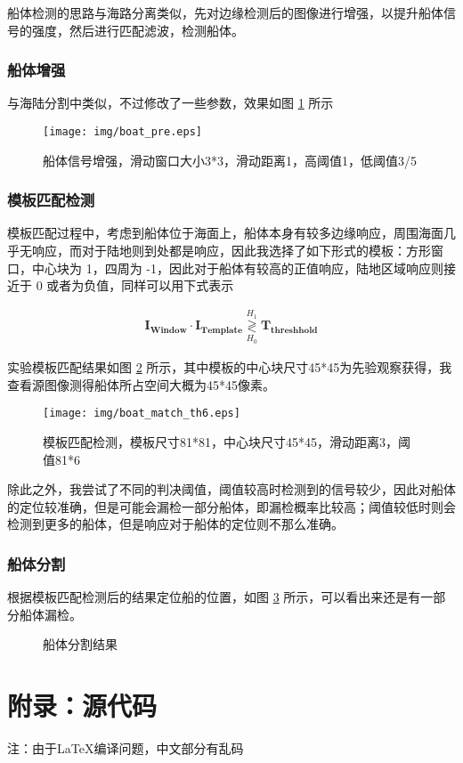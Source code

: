\documentclass[UTF8,12pt]{ctexart}
\begin{document}
船体检测的思路与海路分离类似，先对边缘检测后的图像进行增强，以提升船体信号的强度，然后进行匹配滤波，检测船体。

\subsubsection{船体增强}

与海陆分割中类似，不过修改了一些参数，效果如图 \ref{img_boat_enhance} 所示

\begin{figure}[!htbp]
	\centering
	\texttt{[image: img/boat\_pre.eps]}
	\caption{船体信号增强，滑动窗口大小3*3，滑动距离1，高阈值1，低阈值3/5}
	\label{img_boat_enhance}
\end{figure}

\subsubsection{模板匹配检测}

模板匹配过程中，考虑到船体位于海面上，船体本身有较多边缘响应，周围海面几乎无响应，而对于陆地则到处都是响应，因此我选择了如下形式的模板：方形窗口，中心块为 1，四周为 -1，因此对于船体有较高的正值响应，陆地区域响应则接近于 0 或者为负值，同样可以用下式表示

\begin{align*}
\boldsymbol{I_{Window} \cdot I_{Template}} \mathop{\gtrless}\limits_{H_0}^{H_1} \boldsymbol{T_{threshhold}}
\end{align*}

实验模板匹配结果如图 \ref{img_boat_match} 所示，其中模板的中心块尺寸45*45为先验观察获得，我查看源图像测得船体所占空间大概为45*45像素。

\begin{figure}[!htbp]
	\centering
	\texttt{[image: img/boat\_match\_th6.eps]}
	\caption{模板匹配检测，模板尺寸81*81，中心块尺寸45*45，滑动距离3，阈值81*6}
	\label{img_boat_match}
\end{figure}

除此之外，我尝试了不同的判决阈值，阈值较高时检测到的信号较少，因此对船体的定位较准确，但是可能会漏检一部分船体，即漏检概率比较高；阈值较低时则会检测到更多的船体，但是响应对于船体的定位则不那么准确。

\subsubsection{船体分割}

根据模板匹配检测后的结果定位船的位置，如图 \ref{img_boat} 所示，可以看出来还是有一部分船体漏检。

\begin{figure}[!htbp]
	\centering
	\caption{船体分割结果}
	\label{img_boat}
\end{figure}



\section{附录：源代码}
注：由于LaTeX编译问题，中文部分有乱码

\end{document}
